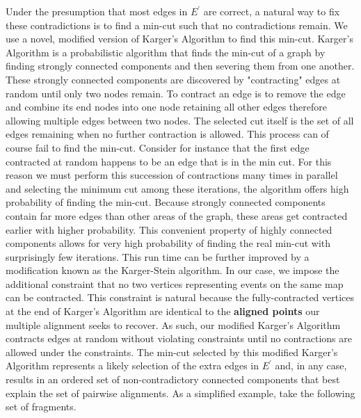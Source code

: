 \documentclass[11pt]{article}
\begin{document}
\par{
Under the presumption that most edges in $E^\prime$ are correct, a natural way to fix these contradictions is to find a min-cut such that no contradictions remain.  We use a novel, modified version of Karger's Algorithm to find this min-cut.  Karger's Algorithm is a probabilistic algorithm that finds the min-cut of a graph by finding strongly connected components and then severing them from one another.  These strongly connected components are discovered by "contracting" edges at random until only two nodes remain.  To contract an edge is to remove the edge and combine its end nodes into one node retaining all other edges therefore allowing multiple edges between two nodes.  The selected cut itself is the set of all edges remaining when no further contraction is allowed.  This process can of course fail to find the min-cut.  Consider for instance that the first edge contracted at random happens to be an edge that is in the min cut.  For this reason we must perform this succession of contractions many times in parallel and selecting the minimum cut among these iterations, the algorithm offers high probability of finding the min-cut.  Because strongly connected components contain far more edges than other areas of the graph, these areas get contracted earlier with higher probability.  This convenient property of highly connected components allows for very high probability of finding the real min-cut with surprisingly few iterations.  This run time can be further improved by a modification known as the Karger-Stein algorithm.  In our case, we impose the additional constraint that no two vertices representing events on the same map can be contracted.  This constraint is natural because the fully-contracted vertices at the end of Karger's Algorithm are identical to the \textbf{aligned points} our multiple alignment seeks to recover.  As such, our modified Karger's Algorithm contracts edges at random without violating constraints until no contractions are allowed under the constraints.  The min-cut selected by this modified Karger's Algorithm represents a likely selection of the extra edges in $E^\prime$ and, in any case, results in an ordered set of non-contradictory connected components that best explain the set of pairwise alignments.\cite{Karger1}\cite{Karger2}
 As a simplified example, take the following set of fragments.}
\end{document}
